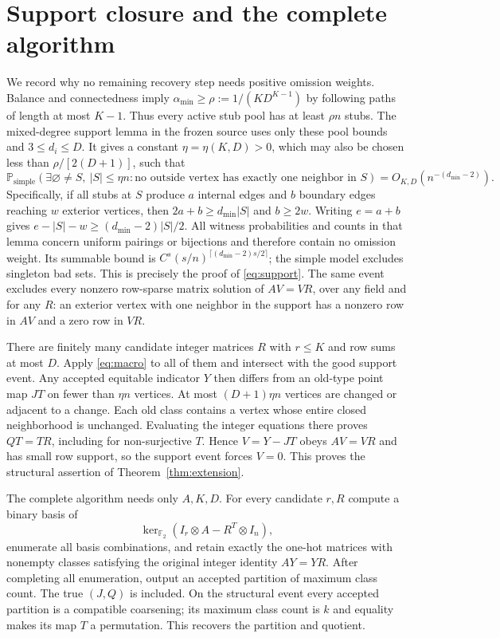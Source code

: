 \documentclass[11pt]{article}
\newcommand{\Prob}{\mathbb P}
\newcommand{\F}{\mathbb F_2}
\begin{document}
\section{Support closure and the complete algorithm}
We record why no remaining recovery step needs positive omission
weights. Balance and connectedness imply
$\alpha_{\min}\ge\rho:=1/(KD^{K-1})$ by following paths of length at
most $K-1$. Thus every active stub pool has at least $\rho n$ stubs.
The mixed-degree support lemma in the frozen source uses only these
pool bounds and $3\le d_i\le D$. It gives a constant
$\eta=\eta(K,D)>0$, which may also be chosen less than
$\rho/[2(D+1)]$, such that
\begin{equation}\label{eq:support}
 \Prob_{\mathrm{simple}}(\exists\varnothing\ne S,\ |S|\le\eta n:
      \text{no outside vertex has exactly one neighbor in }S)
       =O_{K,D}(n^{-(d_{\min}-2)}).
\end{equation}
Specifically, if all stubs at $S$ produce $a$ internal edges and $b$
boundary edges reaching $w$ exterior vertices, then
$2a+b\ge d_{\min}|S|$ and $b\ge2w$.
Writing $e=a+b$ gives
$e-|S|-w\ge(d_{\min}-2)|S|/2$.
All witness probabilities and counts in that lemma concern uniform
pairings or bijections and therefore contain no omission weight.
Its summable bound is $C^s(s/n)^{\lceil(d_{\min}-2)s/2\rceil}$;
the simple model excludes singleton bad sets. This is precisely the
proof of \eqref{eq:support}. The same event excludes every nonzero
row-sparse matrix solution of $AV=VR$, over any field and for any $R$:
an exterior vertex with one neighbor in the support has a nonzero
row in $AV$ and a zero row in $VR$.

There are finitely many candidate integer matrices $R$ with $r\le K$
and row sums at most $D$. Apply \eqref{eq:macro} to all of them and
intersect with the good support event. Any accepted equitable indicator
$Y$ then differs from an old-type point map $JT$ on fewer than $\eta n$
vertices. At most $(D+1)\eta n$ vertices are changed or adjacent to
a change. Each old class contains a vertex whose entire closed
neighborhood is unchanged. Evaluating the integer equations there
proves $QT=TR$, including for non-surjective $T$. Hence
$V=Y-JT$ obeys $AV=VR$ and has small row support, so the support event
forces $V=0$. This proves the structural assertion of
Theorem~\ref{thm:extension}.

The complete algorithm needs only $A,K,D$. For every candidate $r,R$
compute a binary basis of
\[
 \ker_{\F}(I_r\otimes A-R^T\otimes I_n),
\]
enumerate all basis combinations, and retain exactly the one-hot
matrices with nonempty classes satisfying the original integer
identity $AY=YR$. After completing all enumeration, output an accepted
partition of maximum class count. The true $(J,Q)$ is included.
On the structural event every accepted partition is a compatible
coarsening; its maximum class count is $k$ and equality makes its map
$T$ a permutation. This recovers the partition and quotient.
\end{document}
